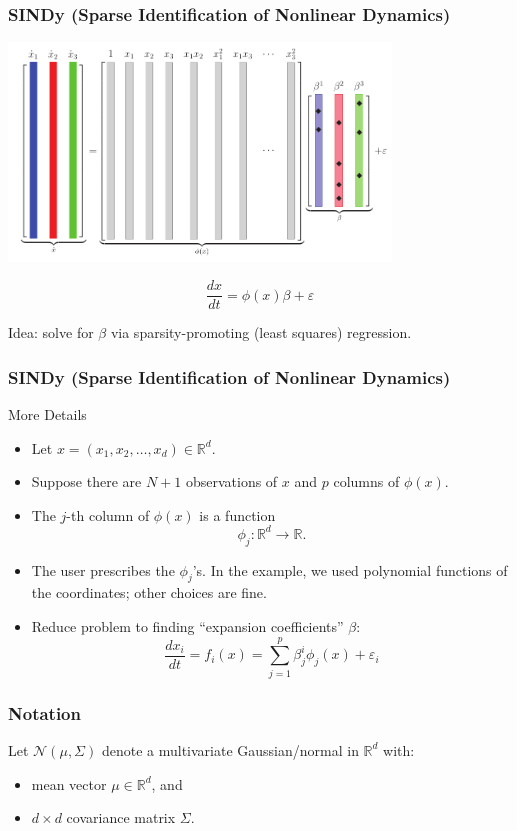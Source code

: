 \documentclass{beamer}
\begin{document}
\begin{frame}
\frametitle{SINDy (Sparse Identification of Nonlinear Dynamics)}
\vspace{-12pt}
\begin{center}
\includegraphics[width=4in]{sindyexplanation}
\end{center}
\vspace{-12pt}
$$
\frac{dx}{dt} = \phi(x) \beta + \varepsilon
$$
\begin{center}
Idea: solve for $\beta$ via sparsity-promoting (least squares) regression.
\end{center}
\end{frame}

\begin{frame}
\frametitle{SINDy (Sparse Identification of Nonlinear Dynamics)}
\begin{block}{More Details}
\begin{itemize}
\item Let $x = (x_1, x_2, \ldots, x_d) \in \mathbb{R}^d$.
\item Suppose there are $N+1$ observations of $x$ and $p$ columns of $\phi(x)$.
\item The $j$-th column of $\phi(x)$ is a function
$$
\phi_j : \mathbb{R}^d \to \mathbb{R}.
$$
\item The user prescribes the $\phi_j$'s.  In the example, we used
polynomial functions of the coordinates; other choices are fine.
\item Reduce problem to finding ``expansion coefficients'' $\beta$:
$$
\frac{dx_i}{dt} = f_i(x) = \sum_{j=1}^p \beta^i_j \phi_j(x) + \varepsilon_i
$$
\end{itemize}
\end{block}
\end{frame}

\begin{frame}
\frametitle{Notation}
Let $\mathcal{N}(\mu, \Sigma)$ denote a multivariate Gaussian/normal in $\mathbb{R}^d$ with:
\begin{itemize}
\item mean vector $\mu \in \mathbb{R}^d$, and
\item $d \times d$ covariance matrix $\Sigma$.
\end{itemize}
\end{frame}
\end{document}
